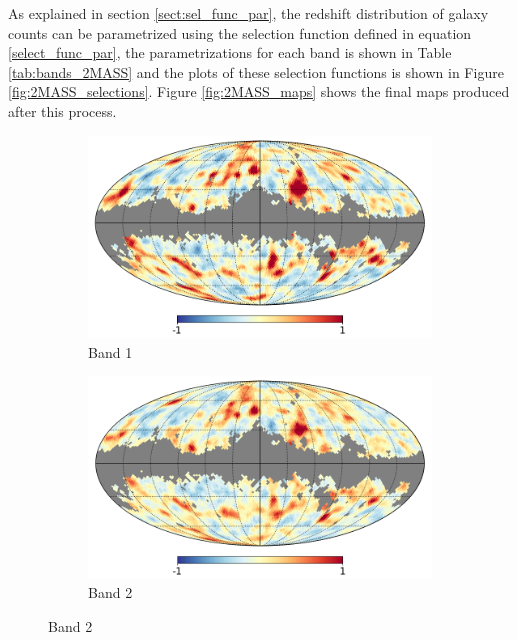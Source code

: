 \documentclass[openany,a4paper,12pt,oneside]{book}
\begin{document}
\begin{spacing}{1.5}
As explained in section \ref{sect:sel_func_par}, the redshift distribution of galaxy counts can be parametrized using the selection function defined in equation \eqref{select_func_par}, the parametrizations for each band is shown in Table \ref{tab:bands_2MASS} and the plots of these selection functions is shown in Figure \ref{fig:2MASS_selections}. Figure \ref{fig:2MASS_maps} shows the final maps produced after this process.

\begin{figure}[!htb]
     \centering
     \begin{subfigure}[b]{0.495\textwidth}
         \centering
         \includegraphics[width=\textwidth]{Imagens/band1_wmask_xsc.png}
         \caption{Band 1}
         \label{fig:contrast_map1}
     \end{subfigure}
     \hfill
     \begin{subfigure}[b]{0.495\textwidth}
         \centering
         \includegraphics[width=\textwidth]{Imagens/band2_wmask_xsc.png}
         \caption{Band 2}
         \label{fig:contrast_map2}
     \end{subfigure}

\end{figure}
\end{spacing}
\end{document}
